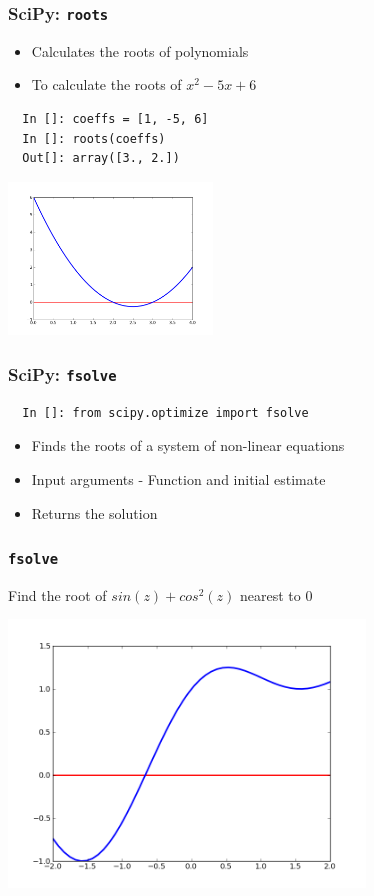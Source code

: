 \documentclass[14pt,compress]{beamer}
\newcommand{\typ}[1]{\lstinline{#1}}
\begin{document}
\begin{frame}[fragile]
\frametitle{SciPy: \typ{roots}}
\begin{itemize}
\item Calculates the roots of polynomials
\item To calculate the roots of $x^2-5x+6$ 
\end{itemize}
\begin{lstlisting}
  In []: coeffs = [1, -5, 6]
  In []: roots(coeffs)
  Out[]: array([3., 2.])
\end{lstlisting}
\vspace*{-.2in}
\begin{center}
\includegraphics[height=1.6in, interpolate=true]{data/roots}    
\end{center}
\end{frame}

\begin{frame}[fragile]
\frametitle{SciPy: \typ{fsolve}}
\begin{small}
\begin{lstlisting}
  In []: from scipy.optimize import fsolve
\end{lstlisting}
\end{small}
\begin{itemize}
\item Finds the roots of a system of non-linear equations
\item Input arguments - Function and initial estimate
\item Returns the solution
\end{itemize}
\end{frame}

\begin{frame}[fragile]
\frametitle{\typ{fsolve}}
Find the root of $sin(z)+cos^2(z)$ nearest to $0$
\vspace{-0.1in}
\begin{center}
\includegraphics[height=2.8in, interpolate=true]{data/fsolve}    
\end{center}
\end{frame}
\end{document}
